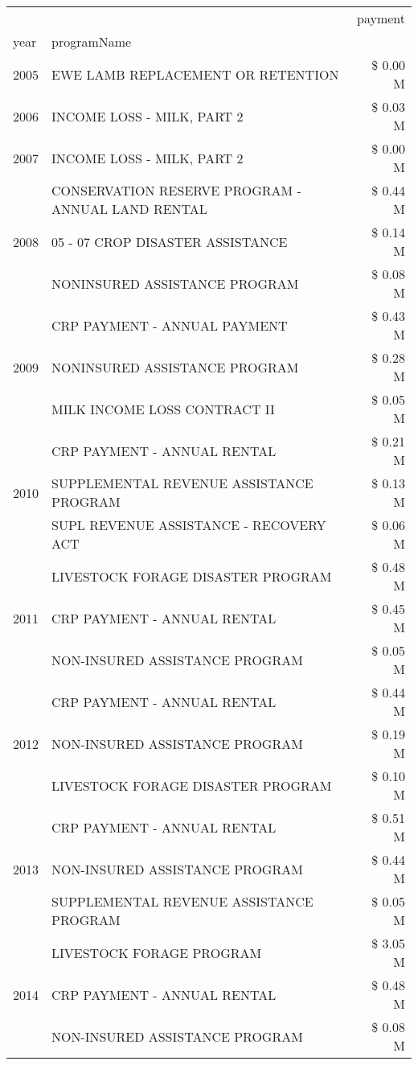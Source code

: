 \begin{tabular}{llr}
\toprule
 &  & payment \\
year & programName &  \\
\midrule
2005 & EWE LAMB REPLACEMENT OR RETENTION & \$ 0.00 M \\
\cline{1-3}
2006 & INCOME LOSS - MILK, PART 2 & \$ 0.03 M \\
\cline{1-3}
2007 & INCOME LOSS - MILK, PART 2 & \$ 0.00 M \\
\cline{1-3}
\multirow[t]{3}{*}{2008} & CONSERVATION RESERVE PROGRAM - ANNUAL LAND RENTAL & \$ 0.44 M \\
 & 05 - 07 CROP DISASTER ASSISTANCE & \$ 0.14 M \\
 & NONINSURED ASSISTANCE PROGRAM & \$ 0.08 M \\
\cline{1-3}
\multirow[t]{3}{*}{2009} & CRP PAYMENT - ANNUAL PAYMENT & \$ 0.43 M \\
 & NONINSURED ASSISTANCE PROGRAM & \$ 0.28 M \\
 & MILK INCOME LOSS CONTRACT II & \$ 0.05 M \\
\cline{1-3}
\multirow[t]{3}{*}{2010} & CRP PAYMENT - ANNUAL RENTAL & \$ 0.21 M \\
 & SUPPLEMENTAL REVENUE ASSISTANCE PROGRAM & \$ 0.13 M \\
 & SUPL REVENUE ASSISTANCE - RECOVERY ACT & \$ 0.06 M \\
\cline{1-3}
\multirow[t]{3}{*}{2011} & LIVESTOCK FORAGE DISASTER PROGRAM & \$ 0.48 M \\
 & CRP PAYMENT - ANNUAL RENTAL & \$ 0.45 M \\
 & NON-INSURED ASSISTANCE PROGRAM & \$ 0.05 M \\
\cline{1-3}
\multirow[t]{3}{*}{2012} & CRP PAYMENT - ANNUAL RENTAL & \$ 0.44 M \\
 & NON-INSURED ASSISTANCE PROGRAM & \$ 0.19 M \\
 & LIVESTOCK FORAGE DISASTER PROGRAM & \$ 0.10 M \\
\cline{1-3}
\multirow[t]{3}{*}{2013} & CRP PAYMENT - ANNUAL RENTAL & \$ 0.51 M \\
 & NON-INSURED ASSISTANCE PROGRAM & \$ 0.44 M \\
 & SUPPLEMENTAL REVENUE ASSISTANCE PROGRAM & \$ 0.05 M \\
\cline{1-3}
\multirow[t]{3}{*}{2014} & LIVESTOCK FORAGE PROGRAM & \$ 3.05 M \\
 & CRP PAYMENT - ANNUAL RENTAL & \$ 0.48 M \\
 & NON-INSURED ASSISTANCE PROGRAM & \$ 0.08 M \\

\end{tabular}
